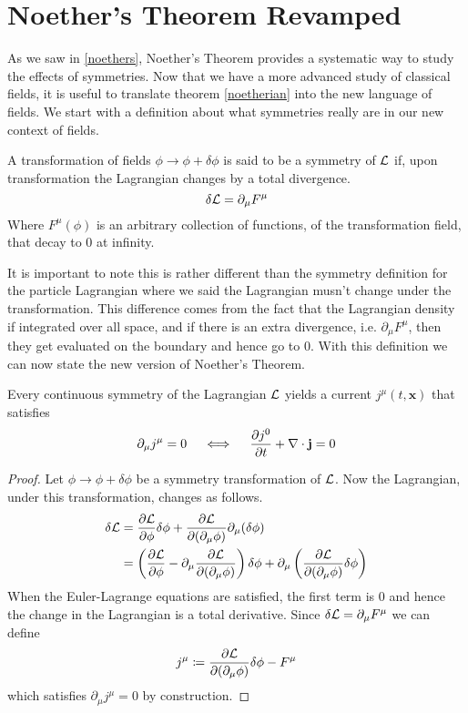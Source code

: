 \section{Noether's Theorem Revamped}\label{noether2}
As we saw in \ref{noethers}, Noether's Theorem provides a systematic way to study the effects of symmetries. Now that we have a more advanced study of classical fields, it is useful to translate theorem \ref{noetherian} into the new language of fields. We start with a definition about what symmetries really are in our new context of fields.
\begin{definition}
A transformation of fields $\phi\to\phi + \delta\phi$ is said to be a symmetry of $\mathcal{L}$ if, upon transformation the Lagrangian changes by a total divergence.
\begin{equation}
\delta\mathcal{L} = \partial_\mu F^\mu
\end{equation}
Where $F^\mu(\phi)$ is an arbitrary collection of functions, of the transformation field, that decay to 0 at infinity.
\end{definition}
It is important to note this is rather different than the symmetry definition for the particle Lagrangian where we said the Lagrangian musn't change under the transformation. This difference comes from the fact that the Lagrangian density if integrated over all space, and if there is an extra divergence, i.e. $\partial_\mu F^\mu$, then they get evaluated on the boundary and hence go to 0. With this definition we can now state the new version of Noether's Theorem.
\begin{theorem}\label{noetherfield}
Every continuous symmetry of the Lagrangian $\mathcal{L}$ yields a current $j^\mu(t,\mathbf{x})$ that satisfies
\begin{equation}\label{eq:conscurrent}
\partial_\mu j^\mu = 0 \quad \iff \quad \pdv{j^0}{t} + \nabla\cdot\mathbf{j} = 0
\end{equation}
\end{theorem}
\begin{proof}
Let $\phi\to\phi + \delta\phi$ be a symmetry transformation of $\mathcal{L}$. Now the Lagrangian, under this transformation, changes as follows.
\begin{align}
\delta\mathcal{L} & = \pdv{\mathcal{L}}{\phi}\delta\phi + \pdv{\mathcal{L}}{(\partial_\mu\phi)}\partial_\mu(\delta\phi) \\
 & = \left(\pdv{\mathcal{L}}{\phi} - \partial_\mu\pdv{\mathcal{L}}{(\partial_\mu\phi)}\right)\delta\phi + \partial_\mu\left(\pdv{\mathcal{L}}{(\partial_\mu\phi)}\delta\phi\right)
\end{align}
When the Euler-Lagrange equations are satisfied, the first term is 0 and hence the change in the Lagrangian is a total derivative. Since $\delta\mathcal{L} = \partial_\mu F^\mu$ we can define
\begin{equation}
j^\mu\coloneqq \pdv{\mathcal{L}}{(\partial_\mu\phi)}\delta\phi - F^\mu
\end{equation}
which satisfies $\partial_\mu j^\mu = 0$ by construction.
\end{proof}
